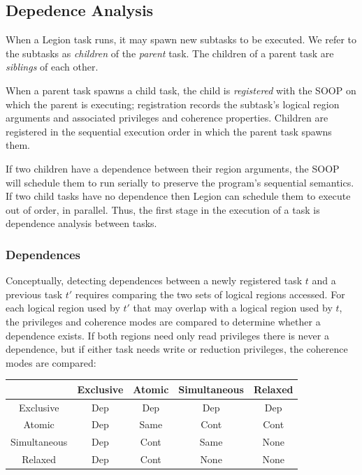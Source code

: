 

\subsection{Depedence Analysis}
\label{sec:dep}


When a Legion task runs, it may spawn new subtasks to be executed.  We refer to the
subtasks as {\em children} of the {\em parent} task.  The children of a parent task
are {\em siblings} of each other.

When a parent task spawns a child task, the child is {\em registered} with the SOOP 
on which the parent is executing; registration records the subtask's logical region
arguments and associated privileges and coherence properties.
Children are registered in the sequential execution order in which the parent task
spawns them.

If two children have a dependence between their region arguments, the
SOOP will schedule them to run serially to preserve the program's
sequential semantics.  If two child tasks have no dependence then
Legion can schedule them to execute out of order, in parallel.  Thus,
the first stage in the execution of a task is dependence analysis
between tasks.

\subsubsection{Dependences}
Conceptually, detecting dependences between a newly registered task $t$ and a previous task 
$t'$ requires comparing the two sets of logical regions accessed.  For each logical region used by
$t'$ that may overlap with a logical region used by $t$, the privileges
and coherence modes are compared to determine whether a dependence exists.  If
both regions need only read privileges there is never a dependence, but if either
task needs write or reduction privileges, the coherence modes are compared:
{\small
\begin{tabular}{c|cccc}
             & Exclusive & Atomic   & Simultaneous & Relaxed \\
\midrule
Exclusive    & Dep & Dep & Dep & Dep \\ 
Atomic       & Dep & Same & Cont & Cont \\
Simultaneous & Dep & Cont & Same & None \\
Relaxed      & Dep & Cont & None & None \\
\end{tabular}
}


